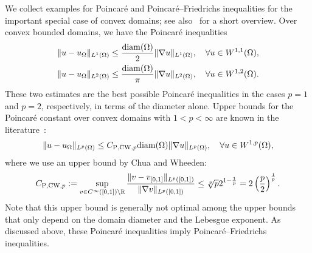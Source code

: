 \documentclass[10pt,letterpaper]{article}
\begin{document}
We collect examples for Poincar\'e and Poincar\'e--Friedrichs inequalities for the important special case of convex domains; 
see also~\cite[Lemma~3.24]{ern2021finite} for a short overview. 
Over convex bounded domains, we have the Poincar\'e inequalities~\cite{bebendorf2003note,acosta2004optimal} 
\begin{align}\label{math:acostaduran}
    \| u - u_{\Omega} \|_{L^{1}(\Omega)}
    \leq 
    \frac{{\operatorname{diam}}(\Omega)}{2}
    \| \nabla u \|_{L^{1}(\Omega)}
    ,
    \quad 
    \forall 
    u \in W^{1,1}(\Omega)
    ,
    \\
    \| u - u_{\Omega} \|_{L^{2}(\Omega)} \label{math:bebendorf}
    \leq 
    \frac{{\operatorname{diam}}(\Omega)}{\pi}
    \| \nabla u \|_{L^{2}(\Omega)}
    ,
    \quad 
    \forall 
    u \in W^{1,2}(\Omega)
    .
\end{align}
These two estimates are the best possible Poincar\'e inequalities in the cases $p=1$ and $p=2$, respectively, in terms of the diameter alone. 
Upper bounds for the Poincar\'e constant over convex domains with $1 < p < \infty$ are known in the literature~\cite[Theorem~1.1, Theorem~1.2]{chua2006estimates}:
\begin{align}\label{math:chuawheeden}
    \| u - u_{\Omega} \|_{L^{p}(\Omega)}
    \leq 
    C_{{\rm P},{\rm CW},p}
    {\operatorname{diam}}(\Omega)
    \| \nabla u \|_{L^{p}(\Omega)}
    ,
    \quad 
    \forall 
    u \in W^{1,p}(\Omega)
    ,
\end{align}
where we use an upper bound by Chua and Wheeden:
\begin{align*}
    C_{{\rm P},{\rm CW},p} 
    := 
    \sup\limits_{ v \in C^\infty([0,1]) \setminus {\mathbb R} } 
    \frac{ 
        \| v - v_{[0,1]} \|_{L^{p}([0,1])} 
    }{ 
        \| \nabla v \|_{L^{p}([0,1])} 
    }
    \leq 
    \sqrt[p]{p} 2^{1-\frac 1 p}
    =
    2
    \left( \frac p 2 \right)^{\frac 1 p}
    .
\end{align*}
Note that this upper bound is generally not optimal among the upper bounds that only depend on the domain diameter and the Lebesgue exponent.
As discussed above, these Poincar\'e inequalities imply Poincar\'e--Friedrichs inequalities. 
\end{document}
